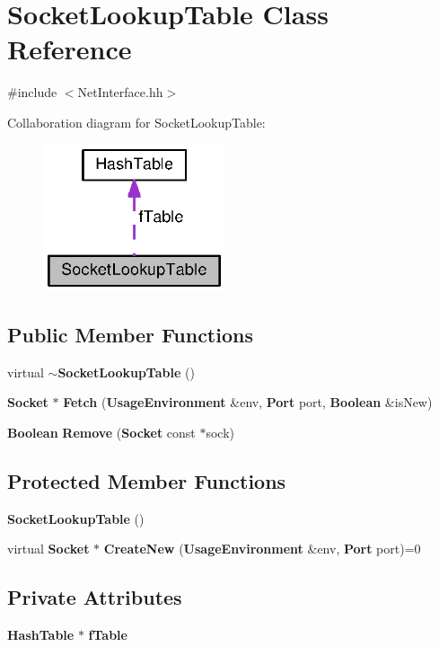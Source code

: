 \section{Socket\+Lookup\+Table Class Reference}
\label{classSocketLookupTable}


{\ttfamily \#include $<$Net\+Interface.\+hh$>$}



Collaboration diagram for Socket\+Lookup\+Table\+:
\nopagebreak
\begin{figure}[H]
\begin{center}
\leavevmode
\includegraphics[width=152pt]{classSocketLookupTable__coll__graph}
\end{center}
\end{figure}
\subsection*{Public Member Functions}
\begin{DoxyCompactItemize}
\item 
virtual {\bf $\sim$\+Socket\+Lookup\+Table} ()
\item 
{\bf Socket} $\ast$ {\bf Fetch} ({\bf Usage\+Environment} \&env, {\bf Port} port, {\bf Boolean} \&is\+New)
\item 
{\bf Boolean} {\bf Remove} ({\bf Socket} const $\ast$sock)
\end{DoxyCompactItemize}
\subsection*{Protected Member Functions}
\begin{DoxyCompactItemize}
\item 
{\bf Socket\+Lookup\+Table} ()
\item 
virtual {\bf Socket} $\ast$ {\bf Create\+New} ({\bf Usage\+Environment} \&env, {\bf Port} port)=0
\end{DoxyCompactItemize}
\subsection*{Private Attributes}
\begin{DoxyCompactItemize}
\item 
{\bf Hash\+Table} $\ast$ {\bf f\+Table}
\end{DoxyCompactItemize}



